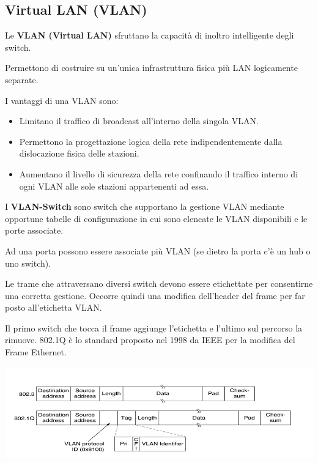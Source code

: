         \subsection{Virtual LAN (VLAN)}
            Le \textbf{VLAN (Virtual LAN)} sfruttano la capacità di inoltro intelligente degli switch.
        
            Permettono di costruire su un'unica infrastruttura fisica più LAN logicamente separate.
        
            I vantaggi di una VLAN sono:
            \begin{itemize}
                \item Limitano il traffico di broadcast all'interno della singola VLAN.
                \item Permettono la progettazione logica della rete indipendentemente dalla dislocazione fisica delle stazioni.
                \item Aumentano il livello di sicurezza della rete confinando il traffico interno di ogni VLAN alle sole stazioni appartenenti ad essa.
            \end{itemize}
        
            I \textbf{VLAN-Switch} sono switch che supportano la gestione VLAN mediante opportune tabelle di configurazione in cui sono elencate le VLAN disponibili e le porte associate.

            Ad una porta possono essere associate più VLAN (se dietro la porta c'è un hub o uno switch).

            Le trame che attraversano diversi switch devono essere etichettate per consentirne una corretta gestione. Occorre quindi una modifica dell'header del frame per far posto all'etichetta VLAN.

            Il primo switch che tocca il frame aggiunge l'etichetta e l'ultimo sul percorso la rimuove. 802.1Q è lo standard proposto nel 1998 da IEEE per la modifica del Frame Ethernet.

            \begin{center}
                \includegraphics[scale=0.35]{chapters/3/assets/schema_t.png}
            \end{center}

